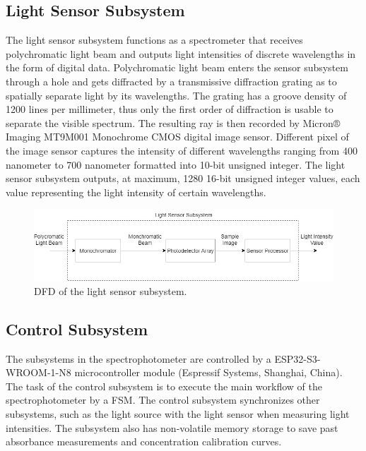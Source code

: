 \documentclass[conference]{IEEEtran}
\begin{document}
\subsection{Light Sensor Subsystem}
The light sensor subsystem functions as a spectrometer that receives polychromatic light beam and outputs light intensities of discrete wavelengths in the form of digital data.
Polychromatic light beam enters the sensor subsystem through a hole and gets diffracted by a transmissive diffraction grating as to spatially separate light by its wavelengths.
The grating has a groove density of 1200 lines per millimeter, thus only the first order of diffraction is usable to separate the visible spectrum.
The resulting ray is then recorded by Micron® Imaging MT9M001 Monochrome CMOS digital image sensor.
Different pixel of the image sensor captures the intensity of different wavelengths ranging from 400 nanometer to 700 nanometer formatted into 10-bit unsigned integer.
The light sensor subsystem outputs, at maximum, 1280 16-bit unsigned integer values, each value representing the light intensity of certain wavelengths. 

    \begin{figure}[htbp]
    \centerline{\includegraphics{light-sensor-dfd.png}}
    \caption{DFD of the light sensor subsystem.}
    \label{light-sensor-dfd}
    \end{figure}

\subsection{Control Subsystem}
The subsystems in the spectrophotometer are controlled by a ESP32-S3-WROOM-1-N8 microcontroller module (Espressif Systems, Shanghai, China). The task of the control subsystem is to execute the main workflow of the spectrophotometer by a FSM. The control subsystem synchronizes other subsystems, such as the light source with the light sensor when measuring light intensities. The subsystem also has non-volatile memory storage to save past absorbance measurements and concentration calibration curves.
\end{document}
